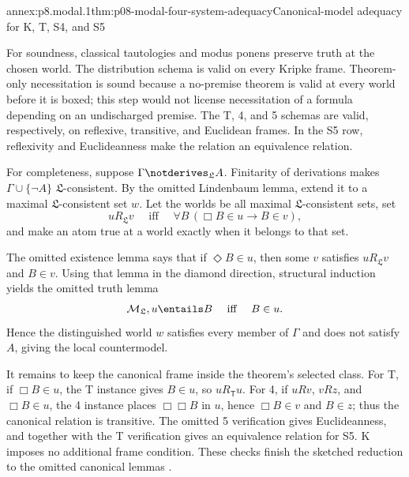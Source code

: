 
\begin{annexitem}{annex:p8.modal.1}{thm:p08-modal-four-system-adequacy}{Canonical-model adequacy for K, T, S4, and S5}

For soundness, classical tautologies and modus ponens preserve truth at the
chosen world.  The distribution schema is valid on every Kripke frame.
Theorem-only necessitation is sound because a no-premise theorem is valid at
every world before it is boxed; this step would not license necessitation of a
formula depending on an undischarged premise.  The T, 4, and 5 schemas are
valid, respectively, on reflexive, transitive, and Euclidean frames.  In the
S5 row, reflexivity and Euclideanness make the relation an equivalence relation.

For completeness, suppose
\(\Gamma\notderives_{\mathfrak L}A\).  Finitarity of derivations makes
\(\Gamma\cup\{\neg A\}\) \(\mathfrak L\)-consistent.  By the omitted
Lindenbaum lemma, extend it to a maximal \(\mathfrak L\)-consistent set \(w\).
Let the worlds be all maximal \(\mathfrak L\)-consistent sets, set
\[
 uR_{\mathfrak L}v
 \quad\text{ iff }\quad
 \forall B\,(\Box B\in u\to B\in v),
\]
and make an atom true at a world exactly when it belongs to that set.

The omitted existence lemma says that if \(\Diamond B\in u\), then some
\(v\) satisfies \(uR_{\mathfrak L}v\) and \(B\in v\).  Using that lemma in the
diamond direction, structural induction yields the omitted truth lemma
\[
 \mathcal M_{\mathfrak L},u\entails B
 \quad\text{ iff }\quad
 B\in u.
\]
Hence the distinguished world \(w\) satisfies every member of \(\Gamma\) and
does not satisfy \(A\), giving the local countermodel.

It remains to keep the canonical frame inside the theorem's selected class.
For T, if \(\Box B\in u\), the T instance gives \(B\in u\), so
\(uR_{\mathsf T}u\).  For 4, if \(uRv\), \(vRz\), and \(\Box B\in u\), the
4 instance places \(\Box\Box B\) in \(u\), hence \(\Box B\in v\) and
\(B\in z\); thus the canonical relation is transitive.  The omitted 5
verification gives Euclideanness, and together with the T verification gives
an equivalence relation for S5.  K imposes no additional frame condition.
These checks finish the sketched reduction to the omitted canonical lemmas
\cite{BlackburnDeRijkeVenema2001,Chellas1980}.
\end{annexitem}
